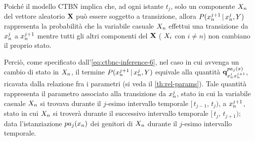 Poiché il modello \acs{CTBN} implica che, ad ogni istante $t_j$, solo un componente $\mathnormal{X}_n$ del vettore aleatorio $\mathbf{X}$ può essere soggetto a transizione, allora $P(\mathnormal{x}_n^{j+1}\,\arrowvert\,\mathnormal{x}_n^j,\mathnormal{Y})$ rappresenta la probabilità che la variabile casuale $\mathnormal{X}_n$ effettui una transizione da $\mathnormal{x}_n^j$ a $\mathnormal{x}_n^{j+1}$ mentre tutti gli altri componenti del  $\mathbf{X}$ (\ie{} $\mathnormal{X}_i$ con $i \neq n$) non cambiano il proprio stato.

Perciò, come specificato dall'\autoref{eq:ctbnc-inference-6}, nel caso in cui avvenga un cambio di stato in $\mathnormal{X}_n$, il termine $P(\mathnormal{x}_n^{j+1}\,\arrowvert\,\mathnormal{x}_n^j,\mathnormal{Y})$ equivale alla quantità $\boldsymbol{\textbf{\text{q}}}_{\mathnormal{x}_n^j\mathnormal{x}_n^{j+1}}^{pa_j(\mathnormal{x})}$, ricavata dalla relazione fra i parametri (si veda il \autoref{th:rel-params}). Tale quantità rappresenta il parametro associato alla transizione da $\mathnormal{x}_n^j$, stato in cui la variabile casuale $\mathnormal{X}_n$ si trovava durante il $j$-esimo intervallo temporale $[\,t_{j-1},\,t_j)$, a $\mathnormal{x}_n^{j+1}$, stato in cui $\mathnormal{X}_n$ si troverà durante il successivo intervallo temporale $[\,t_j,\,t_{j+1})$; data l'istanziazione $pa_j(\mathnormal{x}_n)$ dei genitori di $\mathnormal{X}_n$ durante il $j$-esimo intervallo temporale.

